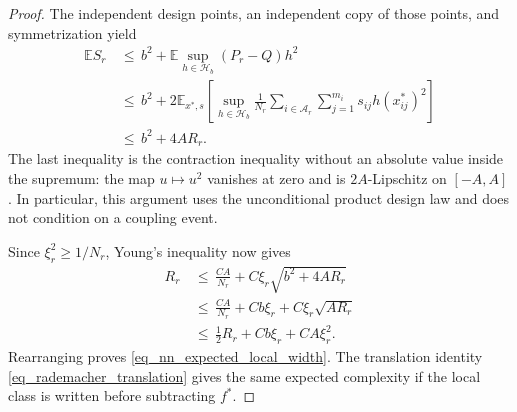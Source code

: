 \documentclass[twoside,11pt]{article}
\newenvironment{revision}{\color{revisionred}}{}
\begin{document}
\begin{revision}
\begin{proof}
The independent design points, an independent copy of those points,
and symmetrization yield
\[
\begin{aligned}
\mathbb E S_r
&\,\le\, b^2+
\mathbb E\sup_{h\in\mathcal H_b}(P_r-Q)h^2\\
&\,\le\, b^2+
2\mathbb E_{x^*,s}\left[
\sup_{h\in\mathcal H_b}
\frac1{N_r}\sum_{i\in\mathcal A_r}\sum_{j=1}^{m_i}
s_{ij}h(x_{ij}^*)^2\right]\\
&\,\le\, b^2+4AR_r.
\end{aligned}
\]
The last inequality is the contraction inequality without an
absolute value inside the supremum: the map $u\mapsto u^2$
vanishes at zero and is $2A$-Lipschitz on $[-A,A]$.
In particular, this argument uses the unconditional product design
law and does not condition on a coupling event.

Since $\xi_r^2\ge1/N_r$, Young's inequality now gives
\[
\begin{aligned}
R_r
&\,\le\,\frac{CA}{N_r}
       +C\xi_r\sqrt{b^2+4AR_r}\\
&\,\le\,\frac{CA}{N_r}
       +Cb\xi_r+C\xi_r\sqrt{AR_r}\\
&\,\le\,\frac12R_r+Cb\xi_r+CA\xi_r^2.
\end{aligned}
\]
Rearranging proves \eqref{eq_nn_expected_local_width}.
The translation identity \eqref{eq_rademacher_translation} gives the
same expected complexity if the local class is written before
subtracting $f^*$.
\end{proof}
\end{revision}
\end{document}
